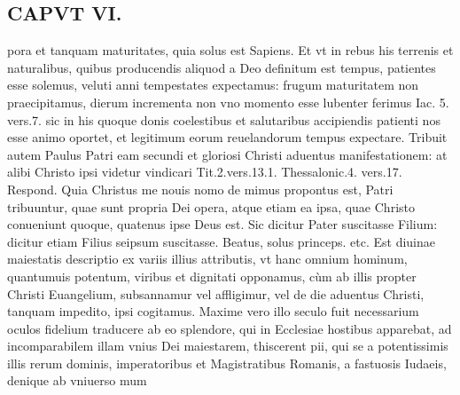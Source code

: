 \documentclass{article}
\begin{document}
\begin{pages}
\section*{CAPVT  VI. }
\marginpar{[ p.47 ]}\pstart pora et tanquam maturitates, quia solus est Sapiens. Et vt in rebus his terrenis et naturalibus, quibus producendis aliquod a Deo definitum est tempus, patientes esse solemus, veluti anni tempestates expectamus: frugum maturitatem non praecipitamus, dierum incrementa non vno momento esse lubenter ferimus Iac. 5. vers.7. sic in his quoque donis coelestibus et salutaribus accipiendis patienti nos esse animo oportet, et legitimum eorum reuelandorum tempus expectare.  \pend\pstart Tribuit autem Paulus Patri eam secundi et gloriosi Christi aduentus manifestationem: at alibi Christo ipsi videtur vindicari Tit.2.vers.13.1. Thessalonic.4. vers.17. Respond. Quia Christus me nouis nomo de mimus propontus est, Patri tribuuntur, quae sunt propria Dei opera, atque etiam ea ipsa, quae Christo conueniunt quoque, quatenus ipse Deus est. Sic dicitur Pater suscitasse Filium: dicitur etiam Filius seipsum suscitasse.  \pend\pstart Beatus, solus princeps. etc. Est diuinae maiestatis descriptio ex variis illius attributis, vt hanc omnium hominum, quantumuis potentum, viribus et dignitati opponamus, cùm ab illis propter Christi Euangelium, subsannamur vel affligimur, vel de die aduentus Christi, tanquam impedito, ipsi cogitamus. Maxime vero illo seculo fuit necessarium oculos fidelium traducere ab eo splendore, qui in Ecclesiae hostibus apparebat, ad incomparabilem illam vnius Dei maiestarem, thiscerent pii, qui se a potentissimis illis rerum dominis, imperatoribus et Magistratibus Romanis, a fastuosis Iudaeis, denique ab vniuerso mum\pend

\end{pages}
\end{document}
